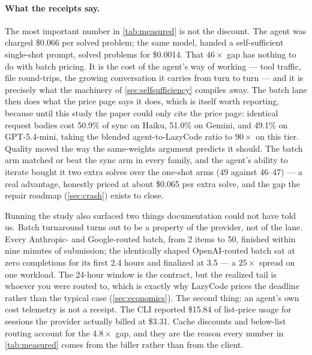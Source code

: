 \documentclass[11pt]{article}
\begin{document}
\paragraph{What the receipts say.} The most important number in
\cref{tab:measured} is not the discount. The agent was charged \$0.066
per solved problem; the same model, handed a self-sufficient single-shot
prompt, solved problems for \$0.0014. That $46\times$ gap has nothing to
do with batch pricing. It is the cost of the agent's way of working ---
tool traffic, file round-trips, the growing conversation it carries from
turn to turn --- and it is precisely what the machinery of
\cref{sec:selfsufficiency} compiles away. The batch lane then does what
the price page says it does, which is itself worth reporting, because
until this study the paper could only cite the price page: identical
request bodies cost 50.9\% of sync on Haiku, 51.0\% on Gemini, and
49.1\% on GPT-5.4-mini, taking the blended agent-to-LazyCode ratio to
$90\times$ on this tier. Quality moved the way the same-weights argument
predicts it should. The batch arm matched or beat the sync arm in every
family, and the agent's ability to iterate bought it two extra solves
over the one-shot arms (49 against 46--47) --- a real advantage, honestly
priced at about \$0.065 per extra solve, and the gap the repair roadmap
(\cref{sec:crash}) exists to close.

Running the study also surfaced two things documentation could not have
told us. Batch turnaround turns out to be a property of the provider,
not of the lane. Every Anthropic- and Google-routed batch, from 2 items
to 50, finished within nine minutes of submission; the identically
shaped OpenAI-routed batch sat at zero completions for its first 2.4
hours and finalized at 3.5 --- a $25\times$ spread on one workload. The
24-hour window is the contract, but the realized tail is whoever you
were routed to, which is exactly why LazyCode prices the deadline rather
than the typical case (\cref{sec:economics}). The second thing: an
agent's own cost telemetry is not a receipt. The CLI reported \$15.84 of
list-price usage for sessions the provider actually billed at \$3.31.
Cache discounts and below-list routing account for the $4.8\times$ gap,
and they are the reason every number in \cref{tab:measured} comes from
the biller rather than from the client.
\end{document}
